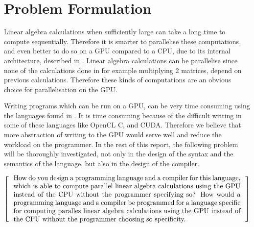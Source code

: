 \newpage
\section{Problem Formulation}

Linear algebra calculations when sufficiently large can take a long time to compute sequentially. 
Therefore it is smarter to parallelise these computations, and even better to do so on a GPU compared to a CPU, due to its internal architecture, described in .
Linear algebra calculations can be parallelise since none of the calculations done in for example multiplying 2 matrices, depend on previous calculations.
Therefore these kinds of computations are an obvious choice for parallelisation on the GPU.

Writing programs which can be run on a GPU, can be very time consuming using the languages found in .
It is time consuming because of the difficult writing in some of these languages like OpenCL C, and CUDA.
Therefore we believe that more abstraction of writing to the GPU would serve well and reduce the workload on the programmer.
In the rest of this report, the following problem will be thoroughly investigated, not only in the design of the syntax and the semantics of the language, but also in the design of the compiler.

\[
  \left[
  \begin{minipage}{\textwidth}
  \centering
  \begin{minipage}{0.96\textwidth}
  How do you design a programming language and a compiler for this language, which is able to compute parallel linear algebra calculations using the GPU instead of the CPU without the programmer specifying so?
  How would a programming language and a compiler be programmed for a language specific for computing paralles linear algebra calculations using the GPU instead of the CPU without the programmer choosing so specificity.  
  \end{minipage}
  \end{minipage}
    \right]
\]